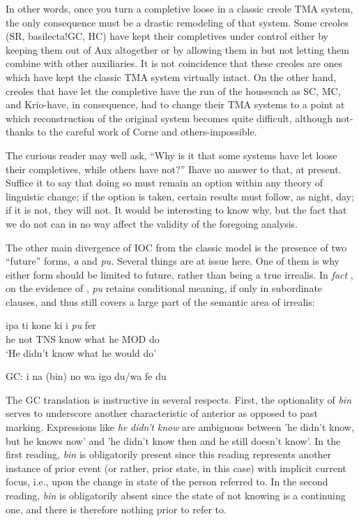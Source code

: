 In other words, once you turn a completive loose in a classic creole TMA system, the only consequence must be a drastic remodeling of that system. Some creoles (SR, basilecta!GC, HC) have kept their completives under control either by keeping them out of Aux al\-together or by allowing them in but not letting them combine with other auxiliaries. It is not coincidence that these creoles are ones which have kept the classic TMA system virtually intact. On the other hand, creoles that have let the completive have the run of the house\-such as SC, MC, and Krio-have, in consequence, had to change their TMA systems to a point at which reconstruction of the original system becomes quite difficult, although not-thanks to the careful work of Corne and others-impossible.

The curious reader may well ask, ``Why is it that some systems
have let loose their completives, while others have not?'' Ihave no answer to that, at present. Suffice it to say that doing so must remain an option within any theory of linguistic change; if the option is taken, certain results must follow, as night, day; if it is not, they will not. It would be interesting to know why, but the fact that we do not can in no way affect the validity of the foregoing analysis.


The other main divergence of IOC from the classic model is the presence of two ``future'' forms, \textit{a} and \textit{pu.} Several things are at issue here. One of them is why either form should be limited to future, rather than being a true irrealis. In \textit{fact} , on the evidence of \citet[103]{Corne1977}, \textit{pu} retains conditional meaning, if only in subordinate clauses, and thus still covers a large part of the semantic area of ir\-realis:


\ea\label{ex:2:118}
\gll ipa ti kone ki i \textit{pu} fer\\
he not TNS know what he MOD do \\
\glt `He didn't know what he would do'
\z

\ea\label{ex:2:119}
 GC: i na (bin) no wa igo du/wa fe du
\z

The GC translation is instructive in several respects. First, the optionality of \textit{bin} serves to underscore another characteristic of ante\-rior as opposed to past marking. Expressions like \textit{he} \textit{didn't} \textit{know} are ambiguous between 'he didn't know, but he knows now' and 'he didn't know then and he still doesn't know'. In the first reading, \textit{bin} is obli\-gatorily present since this reading represents another instance of prior event (or rather, prior state, in this case) with implicit current focus, i.e., upon the change in state of the person referred to. In the second reading, \textit{bin} is obligatorily absent since the state of not knowing is a continuing one, and there is therefore nothing prior to refer to.

